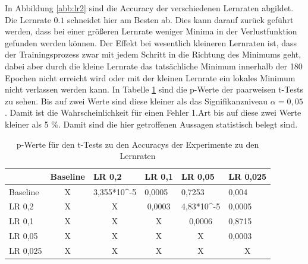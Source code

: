  In Abbildung \ref{abb:lr2} sind die Accuracy der verschiedenen Lernraten abgildet. Die Lernrate $0.1$ schneidet hier am Besten ab. Dies kann darauf zurück geführt werden, dass bei einer größeren Lernrate weniger Minima in der Verlustfunktion gefunden werden können. Der Effekt bei wesentlich kleineren Lernraten ist, dass der Trainingsprozess zwar mit jedem Schritt in die Richtung des Minimums geht, dabei aber durch die kleine Lernrate das tatsächliche Minimum innerhalb der 180 Epochen nicht erreicht wird oder mit der kleinen Lernrate ein lokales Minimum nicht verlassen werden kann. In Tabelle \ref{tab:lr2} sind die p-Werte der paarweisen t-Tests zu sehen. Bis auf zwei Werte sind diese kleiner als das Signifikanzniveau $\alpha=0,05$. Damit ist die Wahrscheinlichkeit für einen Fehler 1.Art bis auf diese zwei Werte kleiner als 5 \%. Damit sind die hier getroffenen Aussagen statistisch belegt sind.
 
\begin{table}[]
\caption{p-Werte für den t-Tests zu den Accuracys der Experimente zu den Lernraten}
\begin{tabular}{l|c|c|c|c|l|}
\cline{2-6}
                               & \multicolumn{1}{l|}{Baseline} & \multicolumn{1}{l|}{LR 0,2}  & \multicolumn{1}{l|}{LR 0,1} & \multicolumn{1}{l|}{LR 0,05}                        & LR 0,025                       \\ \hline
\multicolumn{1}{|l|}{Baseline} & X                             & 3,355*10\textasciicircum{}-5 & \multicolumn{1}{l|}{0,0005} & \multicolumn{1}{l|}{\cellcolor[HTML]{FE0000}0,7253} & 0,004                          \\ \hline
\multicolumn{1}{|l|}{LR 0,2}   & X                             & X                            & 0,0003                      & 4,83*10\textasciicircum{}-5                         & 0,0005                         \\ \hline
\multicolumn{1}{|l|}{LR 0,1}   & X                             & X                            & X                           & 0,0006                                              & \cellcolor[HTML]{FE0000}0,8715 \\ \hline
\multicolumn{1}{|l|}{LR 0,05}  & X                             & X                            & X                           & X                                                   & 0,0003                         \\ \hline
\multicolumn{1}{|l|}{LR 0,025} & X                             & X                            & X                           & X                                                   & \multicolumn{1}{c|}{X}         \\ \hline
\end{tabular}
\label{tab:lr2}
\end{table}
 
